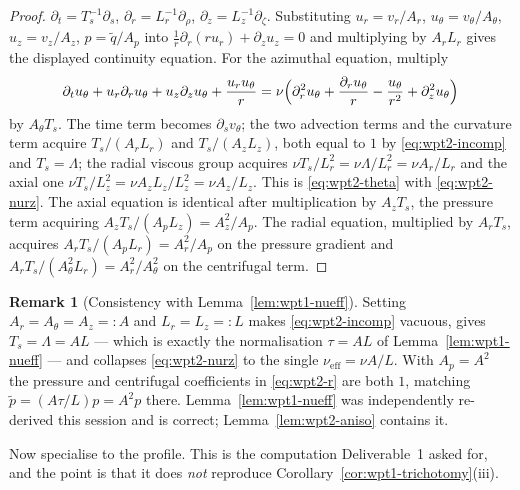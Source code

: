 \documentclass[11pt]{article}
\theoremstyle{definition}
\newtheorem{remark}[theorem]{Remark}
\theoremstyle{remark}
\begin{document}
\begin{proof}
  $\partial_t=T_s^{-1}\partial_s$, $\partial_r=L_r^{-1}\partial_\rho$,
  $\partial_z=L_z^{-1}\partial_\zeta$. Substituting
  $u_r=v_r/A_r$, $u_\theta=v_\theta/A_\theta$, $u_z=v_z/A_z$, $p=\tilde q/A_p$
  into
  $\frac1r\partial_r(ru_r)+\partial_zu_z=0$ and multiplying by $A_rL_r$ gives
  the displayed continuity equation. For the azimuthal equation, multiply
  \[
    \partial_tu_\theta+u_r\partial_ru_\theta+u_z\partial_zu_\theta
      +\frac{u_ru_\theta}{r}
      =\nu\Bigl(\partial_r^2u_\theta+\frac{\partial_ru_\theta}{r}
        -\frac{u_\theta}{r^2}+\partial_z^2u_\theta\Bigr)
  \]
  by $A_\theta T_s$. The time term becomes $\partial_sv_\theta$; the two
  advection terms and the curvature term acquire $T_s/(A_rL_r)$ and
  $T_s/(A_zL_z)$, both equal to $1$ by \eqref{eq:wpt2-incomp} and
  $T_s=\Lambda$; the radial viscous group acquires
  $\nu T_s/L_r^2=\nu\Lambda/L_r^2=\nu A_r/L_r$ and the axial one
  $\nu T_s/L_z^2=\nu A_zL_z/L_z^2=\nu A_z/L_z$. This is
  \eqref{eq:wpt2-theta} with \eqref{eq:wpt2-nurz}. The axial equation is
  identical after multiplication by $A_zT_s$, the pressure term acquiring
  $A_zT_s/(A_pL_z)=A_z^2/A_p$. The radial equation, multiplied by $A_rT_s$,
  acquires $A_rT_s/(A_pL_r)=A_r^2/A_p$ on the pressure gradient and
  $A_rT_s/(A_\theta^2L_r)=A_r^2/A_\theta^2$ on the centrifugal term.
\end{proof}

\begin{remark}[Consistency with Lemma~\ref{lem:wpt1-nueff}]
  \label{rem:wpt2-reduction}
  Setting $A_r=A_\theta=A_z=:A$ and $L_r=L_z=:L$ makes
  \eqref{eq:wpt2-incomp} vacuous, gives $T_s=\Lambda=AL$ --- which is exactly
  the normalisation $\tau=AL$ of Lemma~\ref{lem:wpt1-nueff} --- and collapses
  \eqref{eq:wpt2-nurz} to the single $\nu_{\mathrm{eff}}=\nu A/L$. With
  $A_p=A^2$ the pressure and centrifugal coefficients in
  \eqref{eq:wpt2-r} are both $1$, matching $\tilde p=(A\tau/L)p=A^2p$ there.
  Lemma~\ref{lem:wpt1-nueff} was independently re-derived this session and is
  correct; Lemma~\ref{lem:wpt2-aniso} contains it.
\end{remark}

Now specialise to the profile. This is the computation Deliverable~1 asked
for, and the point is that it does \emph{not} reproduce
Corollary~\ref{cor:wpt1-trichotomy}(iii).
\end{document}
